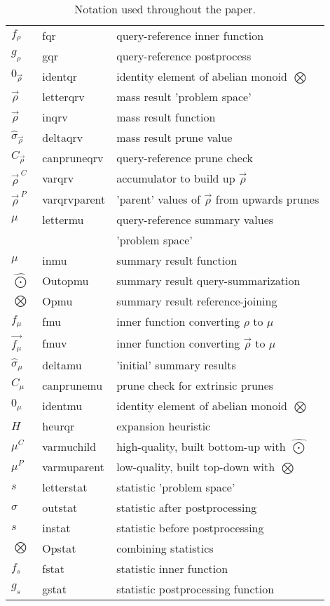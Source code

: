 \documentclass[times, leqno,twocolumn]{article}
\newcommand{\summary}{\hat{\sigma}}
\newcommand{\nameOp}[2]{\mathop{#1\nolimits\!\!_{#2}}}
\newcommand{\myOp}[1]{\nameOp{\bigotimes}{#1}}
\newcommand{\letterqr}{\rho}
\newcommand{\inqr}{\rho}
\newcommand{\Opqr}{\myOp{\letterqr}}
\newcommand{\fqr}{f_{\!\letterqr}}
\newcommand{\gqr}{g_{\!\letterqr}}
\newcommand{\letterqrv}{\vec{\rho}}
\newcommand{\inqrv}{\vec{\rho}}
\newcommand{\deltaqrv}{\summary_{\!\letterqrv}}
\newcommand{\canpruneqrv}{C_{\!\letterqrv}}
\newcommand{\identqr}{0_{\!\letterqrv}}
\newcommand{\varqrv}{\letterqrv^{\:C\!}}
\newcommand{\varqrvparent}{\letterqrv^{\:P\!}}
\newcommand{\lettermu}{\mu}
\newcommand{\inmu}{\mu}
\newcommand{\Outopmu}{\widehat{\nameOp{\bigodot}{\lettermu}}}%
\newcommand{\Opmu}{\myOp{\lettermu}}
\newcommand{\fmu}{f_{\!\lettermu}}
\newcommand{\fmuv}{\vec{f_{\!\lettermu}}}
\newcommand{\deltamu}{\summary_{\!\lettermu}}
\newcommand{\canprunemu}{C_{\!\lettermu}}
\newcommand{\heurqr}{H}
\newcommand{\identmu}{0_{\lettermu}}
\newcommand{\varmuchild}{\lettermu^{\!C}}
\newcommand{\varmuparent}{\lettermu^{\!P}}
\newcommand{\letterstat}{s}
\newcommand{\outstat}{\sigma}
\newcommand{\instat}{s}
\newcommand{\Opstat}{\myOp{\letterstat}}
\newcommand{\fstat}{f_{\!\letterstat}}
\newcommand{\gstat}{g_{\!\letterstat}}
\begin{document}
\begin{appendix}
\begin{table*}
\begin{tabular}{|l|l|l|}
\\ $\fqr$ & fqr & query-reference inner function
\\ $\gqr$ & gqr & query-reference postprocess
\\ $\identqr$ & identqr & identity element of abelian monoid $\Opqr$
\\ $\letterqrv$ & letterqrv & mass result 'problem space'
\\ $\inqrv$ & inqrv & mass result function
\\ $\deltaqrv$ & deltaqrv & mass result prune value
\\ $\canpruneqrv$ & canpruneqrv & query-reference prune check
\\ $\varqrv$ & varqrv & accumulator to build up $\inqrv$
\\ $\varqrvparent$ & varqrvparent & 'parent' values of $\inqrv$ from upwards prunes
\\ \hline $\lettermu$ & lettermu & query-reference summary values
\\ && 'problem space'
\\ $\inmu$ & inmu & summary result function
\\ $\Outopmu$ & Outopmu & summary result query-summarization
\\ $\Opmu$ & Opmu & summary result reference-joining
\\ $\fmu$ & fmu & inner function converting $\inqr$ to $\inmu$
\\ $\fmuv$ & fmuv & inner function converting $\inqrv$ to $\inmu$
\\ $\deltamu$ & deltamu & 'initial' summary results
\\ $\canprunemu$ & canprunemu & prune check for extrinsic prunes
\\ $\identmu$ & identmu & identity element of abelian monoid $\Opmu$
\\ $\heurqr$ & heurqr & expansion heuristic
\\ $\varmuchild$ & varmuchild & high-quality, built bottom-up with $\Outopmu$
\\ $\varmuparent$ & varmuparent & low-quality, built top-down with $\Opmu$
\\ \hline $\letterstat$ & letterstat & statistic 'problem space'
\\ $\outstat$ & outstat & statistic after postprocessing
\\ $\instat$ & instat & statistic before postprocessing
\\ $\Opstat$ & Opstat & combining statistics
\\ $\fstat$ & fstat & statistic inner function
\\ $\gstat$ & gstat & statistic postprocessing function
\\ \hline
\end{tabular}
\caption{Notation used throughout the paper.}
\label{tab:notation}
\end{table*}

\end{appendix}
\end{document}
